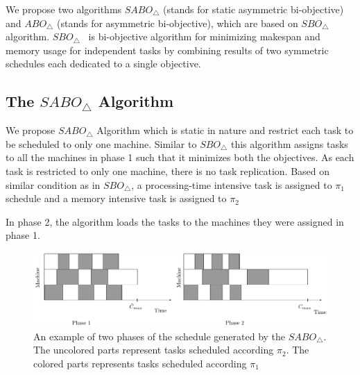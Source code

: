 \documentclass[twocolumn]{svjour3}
\begin{document}
We propose two algorithms $SABO_\triangle$ (stands for static
asymmetric bi-objective) and $ABO_\triangle$ (stands for asymmetric
bi-objective), which are based on $SBO_\triangle$
algorithm. $SBO_\triangle$~\cite{10.1109/IPDPS.2008.4536292} is
bi-objective algorithm for minimizing makespan and memory usage for
independent tasks by combining results of two symmetric schedules each
dedicated to a single objective.
 
\subsection{The $SABO_\triangle$ Algorithm}
                     
We propose $SABO_\triangle$ Algorithm which is static in nature and
restrict each task to be scheduled to only one machine. Similar to
$SBO_\triangle$ this algorithm assigns tasks to all the machines in
phase 1 such that it minimizes both the objectives. As each task is
restricted to only one machine, there is no task replication. Based on
similar condition as in $SBO_\triangle$, a processing-time intensive
task is assigned to $\pi_1$ schedule and a memory intensive task is
assigned to $\pi_2$
                     
In phase 2, the algorithm loads the tasks to the machines they were assigned in phase 1.\\
                     
\begin{figure}[htp]
  \centering
  \includegraphics[width= 16 cm]{mem2.pdf}
  \caption{An example of two phases of the schedule generated by the
    $SABO_\triangle$. The uncolored parts represent tasks scheduled
    according $\pi_2$. The colored parts represents tasks scheduled
    according $\pi_1$}
  \label{fig:ch5-1}
\end{figure} 
\end{document}
